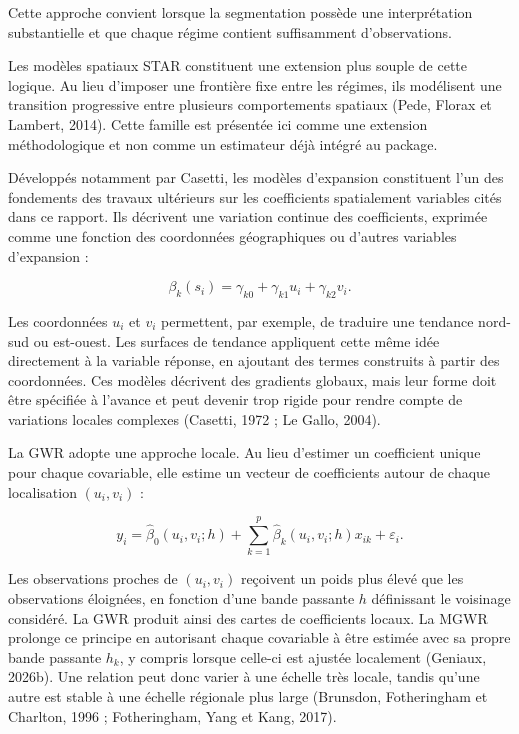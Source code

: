 \documentclass[11pt,a4paper]{article}
\begin{document}
Cette approche convient lorsque la segmentation possède une interprétation substantielle et que chaque régime contient suffisamment d'observations.

Les modèles spatiaux STAR constituent une extension plus souple de cette logique. Au lieu d'imposer une frontière fixe entre les régimes, ils modélisent une transition progressive entre plusieurs comportements spatiaux (Pede, Florax et Lambert, 2014). Cette famille est présentée ici comme une extension méthodologique et non comme un estimateur déjà intégré au package.

Développés notamment par Casetti, les modèles d'expansion constituent l'un des fondements des travaux ultérieurs sur les coefficients spatialement variables cités dans ce rapport. Ils décrivent une variation continue des coefficients, exprimée comme une fonction des coordonnées géographiques ou d'autres variables d'expansion :

\begin{equation}
    \beta_k(s_i)=\gamma_{k0}+\gamma_{k1}u_i+\gamma_{k2}v_i.
\end{equation}

Les coordonnées $u_i$ et $v_i$ permettent, par exemple, de traduire une tendance nord-sud ou est-ouest. Les surfaces de tendance appliquent cette même idée directement à la variable réponse, en ajoutant des termes construits à partir des coordonnées. Ces modèles décrivent des gradients globaux, mais leur forme doit être spécifiée à l'avance et peut devenir trop rigide pour rendre compte de variations locales complexes (Casetti, 1972 ; Le Gallo, 2004).

La GWR adopte une approche locale. Au lieu d'estimer un coefficient unique pour chaque covariable, elle estime un vecteur de coefficients autour de chaque localisation $(u_i,v_i)$ :

\begin{equation}
    y_i=\hat{\beta}_0(u_i,v_i;h)+\sum_{k=1}^{p}\hat{\beta}_k(u_i,v_i;h)x_{ik}+\varepsilon_i.
\end{equation}

Les observations proches de $(u_i,v_i)$ reçoivent un poids plus élevé que les observations éloignées, en fonction d'une bande passante $h$ définissant le voisinage considéré. La GWR produit ainsi des cartes de coefficients locaux. La MGWR prolonge ce principe en autorisant chaque covariable à être estimée avec sa propre bande passante $h_k$, y compris lorsque celle-ci est ajustée localement (Geniaux, 2026b). Une relation peut donc varier à une échelle très locale, tandis qu'une autre est stable à une échelle régionale plus large (Brunsdon, Fotheringham et Charlton, 1996 ; Fotheringham, Yang et Kang, 2017).
\end{document}
